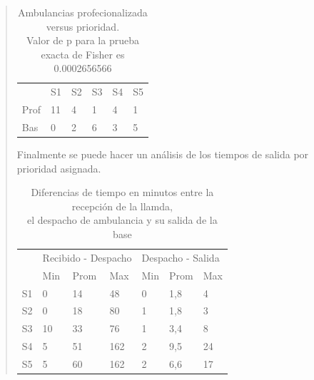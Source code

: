 \documentclass{article}
\begin{document}
\begin{quotation}
\begin{table}[h]
\centering
\captionsetup{justification=centering,margin=2cm}
\begin{tabular}{llllll}
     & S1 & S2 & S3 & S4 & S5 \\
Prof & 11 & 4  & 1  & 4  & 1  \\
Bas  & 0  & 2  & 6  & 3  & 5 
\end{tabular}
\centering
\caption{Ambulancias profecionalizada versus prioridad. \\
Valor de p para la prueba exacta de Fisher es 0.0002656566}
\label{my-label}
\end{table}

Finalmente se puede hacer un análisis de los tiempos de salida por prioridad asignada.

\begin{table}[]
\centering
\captionsetup{justification=centering,margin=2cm}
\begin{tabular}{l|lll|lll}
   & \multicolumn{3}{l}{Recibido - Despacho} & \multicolumn{3}{l}{Despacho - Salida} \\
   & Min         & Prom         & Max        & Min        & Prom        & Max        \\ \hline
S1 & 0           & 14           & 48         & 0          & 1,8         & 4          \\
S2 & 0           & 18           & 80         & 1          & 1,8         & 3          \\
S3 & 10          & 33           & 76         & 1          & 3,4         & 8          \\
S4 & 5           & 51           & 162        & 2          & 9,5         & 24         \\
S5 & 5           & 60           & 162        & 2          & 6,6         & 17        
\end{tabular}
\caption{Diferencias de tiempo en minutos entre la recepción de la llamda, \\
el despacho de ambulancia y su salida de la base}
\label{my-label}
\end{table}


    \end{quotation}
    
\end{document}
